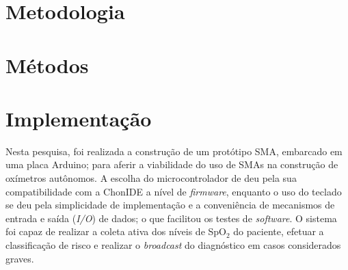 

\section{Metodologia}\label{sec:metodology}


\section{Métodos}\label{sec:methods}



\section{Implementação}\label{sec:deployment}
Nesta pesquisa, foi realizada a construção de um protótipo SMA, embarcado em uma placa Arduino; para aferir a viabilidade do uso de SMAs na construção de oxímetros autônomos. A escolha do microcontrolador de deu pela sua compatibilidade com a ChonIDE a nível de \textit{firmware}, enquanto o uso do teclado se deu pela simplicidade de implementação e a conveniência de mecanismos de entrada e saída (\textit{I/O}) de dados; o que facilitou os testes de \textit{software}.
O sistema foi capaz de realizar a coleta ativa dos níveis de SpO$_2$ do paciente, efetuar a classificação de risco e realizar o \textit{broadcast} do diagnóstico em casos considerados graves.


